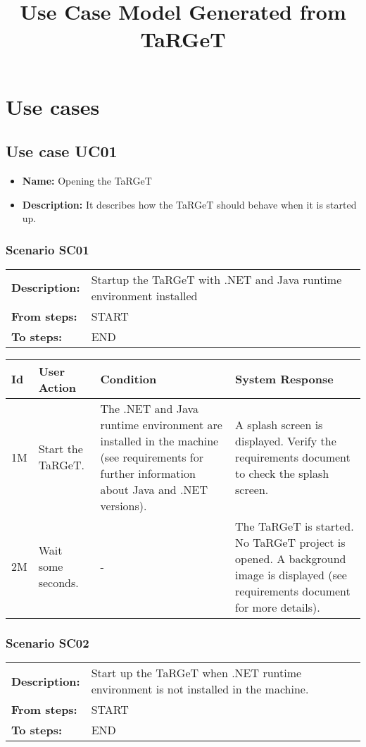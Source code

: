 \documentclass[a4paper,11pt]{article}
\title{Use Case Model Generated from TaRGeT}
\newcommand{\bl}{\\ \hline}
\begin{document}
\maketitle
\section*{Use cases}
\subsection*{Use case UC01}
\begin{itemize}
\item {\bf Name: }Opening the TaRGeT
\item {\bf Description: }It describes how the TaRGeT should behave when it is
				started up.
\end{itemize}
\subsubsection*{Scenario SC01}
\begin{tabular}{p{1in}p{4in}}
{\bf Description:} & Startup the TaRGeT with .NET and Java runtime
					environment installed \\
{\bf From steps:} & START \\
{\bf To steps:} & END \\
\end{tabular}
 
\begin{tabular}{|p{0.8in}|p{1.6in}|p{1.6in}|p{1.6in}|}
\hline
Id & User Action & Condition & System Response  \bl 
1M & 
						Start the TaRGeT.
				 & The .NET and Java runtime environment are installed in
						the machine (see requirements for further information about Java
						and .NET versions). & 
						A splash screen is displayed. Verify the requirements
						document to
						check the splash screen.
				 \bl 
2M & 
						Wait some seconds.
				 & - & 
						The TaRGeT is started. No TaRGeT project is opened. A
						background image
						is displayed (see requirements document for more
						details).
					 \bl 
\end{tabular}
\subsubsection*{Scenario SC02}
\begin{tabular}{p{1in}p{4in}}
{\bf Description:} & Start up the TaRGeT when .NET runtime environment is
					not installed in the machine. \\
{\bf From steps:} & START \\
{\bf To steps:} & END \\
\end{tabular}
 
\end{document}
